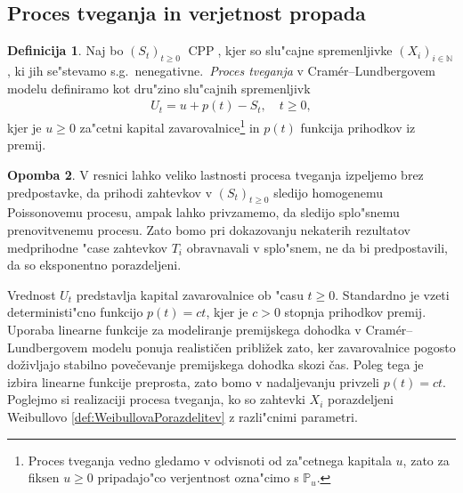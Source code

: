 \documentclass[12pt, a4paper, reqno]{amsart}
\theoremstyle{definition}
\newtheorem{definicija}{Definicija}[section]
\newtheorem{opomba}[definicija]{Opomba}
\theoremstyle{plain}
\newcommand{\N}{\mathbb{N}}
\newcommand{\Prob}{\mathbb{P}}
\newcommand{\1}{\mathds{1}}
\DeclareMathOperator{\CPP}{CPP}
\newcommand*{\refPriloga}[1]{%
  \begingroup
    \hypersetup{
      linkcolor=properpurple,
      linkbordercolor=properpurple,
    }%
    \ref{#1}%
  \endgroup
}
\begin{document}
    \subsection{Proces tveganja in verjetnost propada}

        \begin{definicija}
            Naj bo $(S_t)_{t\geq0 }$ $\CPP$, kjer so slu"cajne spremenljivke $(X_i)_{i\in\N}$, 
            ki jih se"stevamo s.g.\ nenegativne.\ \textit{Proces tveganja} v Cramér--Lundbergovem 
            modelu definiramo kot dru"zino slu"cajnih spremenljivk 
            \begin{align*}
                U_t = u + p(t) - S_t, \quad t\geq0,
            \end{align*}
            kjer je $u \geq 0$ za"cetni kapital zavarovalnice\footnote{Proces tveganja vedno gledamo 
            v odvisnoti od  za"cetnega kapitala $u$, zato za fiksen $u\geq0$ pripadajo"co verjentnost
            ozna"cimo s $\Prob_u$.} in $p(t)$ funkcija prihodkov iz premij. 
            \label{def:procesTveganja}
        \end{definicija}

        \begin{opomba}
            V resnici lahko veliko lastnosti procesa tveganja izpeljemo brez predpostavke, da prihodi 
            zahtevkov v $(S_t)_{t\geq0}$ sledijo homogenemu Poissonovemu procesu,
            ampak lahko privzamemo, da sledijo splo"snemu prenovitvenemu procesu. 
            Zato bomo pri dokazovanju nekaterih rezultatov medprihodne "case zahtevkov $T_i$ obravnavali v 
            splo"snem, ne da bi predpostavili, da so eksponentno porazdeljeni.
            \label{op:procesTveganja}
        \end{opomba}

        Vrednost $U_t$ predstavlja kapital zavarovalnice ob "casu $t\geq0$. Standardno je  
        vzeti deterministi"cno funkcijo $p(t) = ct$, kjer je $c>0$ stopnja prihodkov premij.
        Uporaba linearne funkcije za modeliranje premijskega dohodka v Cramér--Lundbergovem 
        modelu ponuja realističen približek zato, ker zavarovalnice pogosto doživljajo 
        stabilno povečevanje premijskega dohodka skozi čas. Poleg tega je izbira linearne 
        funkcije preprosta, zato bomo v nadaljevanju privzeli $p(t) = ct$. Poglejmo si 
        realizaciji procesa tveganja, ko so zahtevki $X_i$ porazdeljeni Weibullovo 
        \refPriloga{def:WeibullovaPorazdelitev} z razli"cnimi parametri. 
\end{document}
